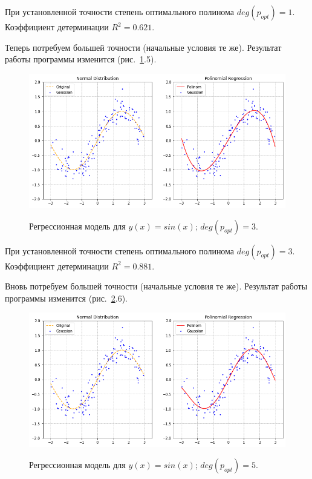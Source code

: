 \documentclass[12pt, a4paper]{article}
\begin{document}
    При установленной точности степень оптимального полинома $deg(p_{opt}) = 
    1$. Коэффициент детерминации $R^{2} = 0.621$.
    
    Теперь потребуем большей точности (начальные условия те же). Результат 
    работы программы изменится (рис.~\ref{image45}.5).
    
    \begin{figure}[h!]
        \center
        \includegraphics[width = 14cm]{f4_2.png}
        \label{image45}
        \caption{Регрессионная модель для $y(x) = sin(x)$; $deg(p_{opt}) = 
            3$.}
    \end{figure}
    
    При установленной точности степень оптимального полинома $deg(p_{opt}) = 
    3$. Коэффициент детерминации $R^{2} = 0.881$.
    
    Вновь потребуем большей точности (начальные условия те же). Результат 
    работы программы изменится (рис.~\ref{image46}.6).
    
    \begin{figure}[h!]
        \center
        \includegraphics[width = 14cm]{f4_3.png}
        \label{image46}
        \caption{Регрессионная модель для $y(x) = sin(x)$; $deg(p_{opt}) = 
            5$.}
    \end{figure}
    
\end{document}
